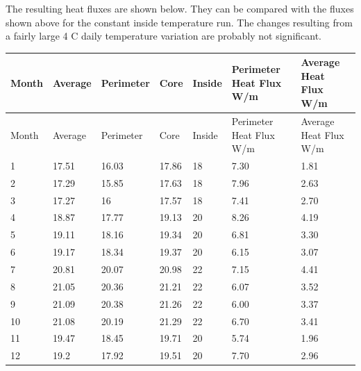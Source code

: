 The resulting heat fluxes are shown below. They can be compared with the fluxes shown above for the constant inside temperature run. The changes resulting from a fairly large 4 C daily temperature variation are probably not significant.

\begin{longtable}[c]{p{0.85in}p{0.85in}p{0.85in}p{0.85in}p{0.85in}p{0.85in}p{0.85in}}
\toprule 
Month & Average & Perimeter & Core & Inside & Perimeter Heat Flux W/m & Average Heat Flux W/m \tabularnewline
\midrule
\endfirsthead

\toprule 
Month & Average & Perimeter & Core & Inside & Perimeter Heat Flux W/m & Average Heat Flux W/m \tabularnewline
\midrule
\endhead

1 & 17.51 & 16.03 & 17.86 & 18 & 7.30 & 1.81 \tabularnewline
2 & 17.29 & 15.85 & 17.63 & 18 & 7.96 & 2.63 \tabularnewline
3 & 17.27 & 16 & 17.57 & 18 & 7.41 & 2.70 \tabularnewline
4 & 18.87 & 17.77 & 19.13 & 20 & 8.26 & 4.19 \tabularnewline
5 & 19.11 & 18.16 & 19.34 & 20 & 6.81 & 3.30 \tabularnewline
6 & 19.17 & 18.34 & 19.37 & 20 & 6.15 & 3.07 \tabularnewline
7 & 20.81 & 20.07 & 20.98 & 22 & 7.15 & 4.41 \tabularnewline
8 & 21.05 & 20.36 & 21.21 & 22 & 6.07 & 3.52 \tabularnewline
9 & 21.09 & 20.38 & 21.26 & 22 & 6.00 & 3.37 \tabularnewline
10 & 21.08 & 20.19 & 21.29 & 22 & 6.70 & 3.41 \tabularnewline
11 & 19.47 & 18.45 & 19.71 & 20 & 5.74 & 1.96 \tabularnewline
12 & 19.2 & 17.92 & 19.51 & 20 & 7.70 & 2.96 \tabularnewline
\bottomrule
\end{longtable}
